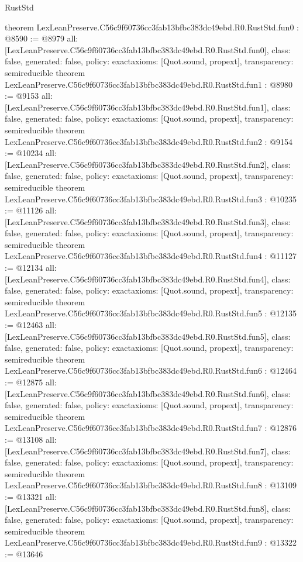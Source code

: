 \begin{lexlean}{RustStd}
\begin{coremodule}
{}
theorem LexLeanPreserve.C56c9f60736cc3fab13bfbc383dc49ebd.R0.RustStd.fun0 : @8590 := @8979 {
  all: [LexLeanPreserve.C56c9f60736cc3fab13bfbc383dc49ebd.R0.RustStd.fun0],
  class: false,
  generated: false,
  policy: exact{axioms: [Quot.sound, propext]},
  transparency: semireducible
}
theorem LexLeanPreserve.C56c9f60736cc3fab13bfbc383dc49ebd.R0.RustStd.fun1 : @8980 := @9153 {
  all: [LexLeanPreserve.C56c9f60736cc3fab13bfbc383dc49ebd.R0.RustStd.fun1],
  class: false,
  generated: false,
  policy: exact{axioms: [Quot.sound, propext]},
  transparency: semireducible
}
theorem LexLeanPreserve.C56c9f60736cc3fab13bfbc383dc49ebd.R0.RustStd.fun2 : @9154 := @10234 {
  all: [LexLeanPreserve.C56c9f60736cc3fab13bfbc383dc49ebd.R0.RustStd.fun2],
  class: false,
  generated: false,
  policy: exact{axioms: [Quot.sound, propext]},
  transparency: semireducible
}
theorem LexLeanPreserve.C56c9f60736cc3fab13bfbc383dc49ebd.R0.RustStd.fun3 : @10235 := @11126 {
  all: [LexLeanPreserve.C56c9f60736cc3fab13bfbc383dc49ebd.R0.RustStd.fun3],
  class: false,
  generated: false,
  policy: exact{axioms: [Quot.sound, propext]},
  transparency: semireducible
}
theorem LexLeanPreserve.C56c9f60736cc3fab13bfbc383dc49ebd.R0.RustStd.fun4 : @11127 := @12134 {
  all: [LexLeanPreserve.C56c9f60736cc3fab13bfbc383dc49ebd.R0.RustStd.fun4],
  class: false,
  generated: false,
  policy: exact{axioms: [Quot.sound, propext]},
  transparency: semireducible
}
theorem LexLeanPreserve.C56c9f60736cc3fab13bfbc383dc49ebd.R0.RustStd.fun5 : @12135 := @12463 {
  all: [LexLeanPreserve.C56c9f60736cc3fab13bfbc383dc49ebd.R0.RustStd.fun5],
  class: false,
  generated: false,
  policy: exact{axioms: [Quot.sound, propext]},
  transparency: semireducible
}
theorem LexLeanPreserve.C56c9f60736cc3fab13bfbc383dc49ebd.R0.RustStd.fun6 : @12464 := @12875 {
  all: [LexLeanPreserve.C56c9f60736cc3fab13bfbc383dc49ebd.R0.RustStd.fun6],
  class: false,
  generated: false,
  policy: exact{axioms: [Quot.sound, propext]},
  transparency: semireducible
}
theorem LexLeanPreserve.C56c9f60736cc3fab13bfbc383dc49ebd.R0.RustStd.fun7 : @12876 := @13108 {
  all: [LexLeanPreserve.C56c9f60736cc3fab13bfbc383dc49ebd.R0.RustStd.fun7],
  class: false,
  generated: false,
  policy: exact{axioms: [Quot.sound, propext]},
  transparency: semireducible
}
theorem LexLeanPreserve.C56c9f60736cc3fab13bfbc383dc49ebd.R0.RustStd.fun8 : @13109 := @13321 {
  all: [LexLeanPreserve.C56c9f60736cc3fab13bfbc383dc49ebd.R0.RustStd.fun8],
  class: false,
  generated: false,
  policy: exact{axioms: [Quot.sound, propext]},
  transparency: semireducible
}
theorem LexLeanPreserve.C56c9f60736cc3fab13bfbc383dc49ebd.R0.RustStd.fun9 : @13322 := @13646 {
}
\end{coremodule}
\end{lexlean}
